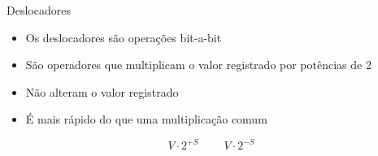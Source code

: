 \documentclass[11pt]{beamer}
\begin{document}
	\begin{frame}{Deslocadores}
		\only<1>
		{
			\begin{itemize}
				\presentationPause\item Os deslocadores são operações bit-a-bit
				\presentationPause\item São operadores que multiplicam o valor registrado por potências de 2
				\presentationPause\item Não alteram o valor registrado
				\presentationPause\item É mais rápido do que uma multiplicação comum
			\end{itemize}
			\presentationPause
			\begin{equation}\nonumber
			V\!\cdot\!2^{+S} \ \ \ \ \ \ \ \ \ \ V\!\cdot\!2^{-S}
			\end{equation}
		}
		{
			 \presentationPause
		}		
	\end{frame}
\end{document}
